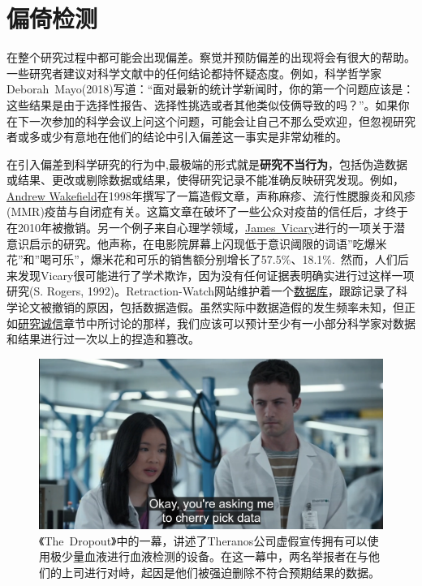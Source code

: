 \documentclass[
  letterpaper,
  DIV=11,
  numbers=noendperiod]{scrreprt}
\begin{document}

\hypertarget{sec-bias}{%
\chapter{偏倚检测}\label{sec-bias}}

在整个研究过程中都可能会出现偏差。察觉并预防偏差的出现将会有很大的帮助。一些研究者建议对科学文献中的任何结论都持怀疑态度。例如，科学哲学家Deborah~Mayo(2018)写道：``面对最新的统计学新闻时，你的第一个问题应该是：这些结果是由于选择性报告、选择性挑选或者其他类似伎俩导致的吗？''。如果你在下一次参加的科学会议上问这个问题，可能会让自己不那么受欢迎，但忽视研究者或多或少有意地在他们的结论中引入偏差这一事实是非常幼稚的。

在引入偏差到科学研究的行为中,最极端的形式就是\textbf{研究不当行为}，包括伪造数据或结果、更改或剔除数据或结果，使得研究记录不能准确反映研究发现。例如，\href{https://en.wikipedia.org/wiki/Andrew_Wakefield}{Andrew
Wakefield}在1998年撰写了一篇造假文章，声称麻疹、流行性腮腺炎和风疹(MMR)疫苗与自闭症有关。这篇文章在破坏了一些公众对疫苗的信任后，才终于在2010年被撤销。另一个例子来自心理学领域，\href{https://en.wikipedia.org/wiki/James_Vicary}{James~Vicary}进行的一项关于潜意识启示的研究。他声称，在电影院屏幕上闪现低于意识阈限的词语''吃爆米花''和''喝可乐''，爆米花和可乐的销售额分别增长了57.5\%、18.1\%.~然而，人们后来发现Vicary很可能进行了学术欺诈，因为没有任何证据表明确实进行过这样一项研究(S.
Rogers,
1992)。Retraction-Watch网站维护着一个\href{http://retractiondatabase.org}{数据库}，跟踪记录了科学论文被撤销的原因，包括数据造假。虽然实际中数据造假的发生频率未知，但正如\protect\hyperlink{integrity}{研究诚信}章节中所讨论的那样，我们应该可以预计至少有一小部分科学家对数据和结果进行过一次以上的捏造和篡改。

\begin{figure}

{\centering \includegraphics[width=1\textwidth,height=\textheight]{images/dropout_outlier.png}

}

\caption{\label{fig-outliers}《The~Dropout》中的一幕，讲述了Theranos公司虚假宣传拥有可以使用极少量血液进行血液检测的设备。在这一幕中，两名举报者在与他们的上司进行对峙，起因是他们被强迫删除不符合预期结果的数据。}

\end{figure}
\end{document}
